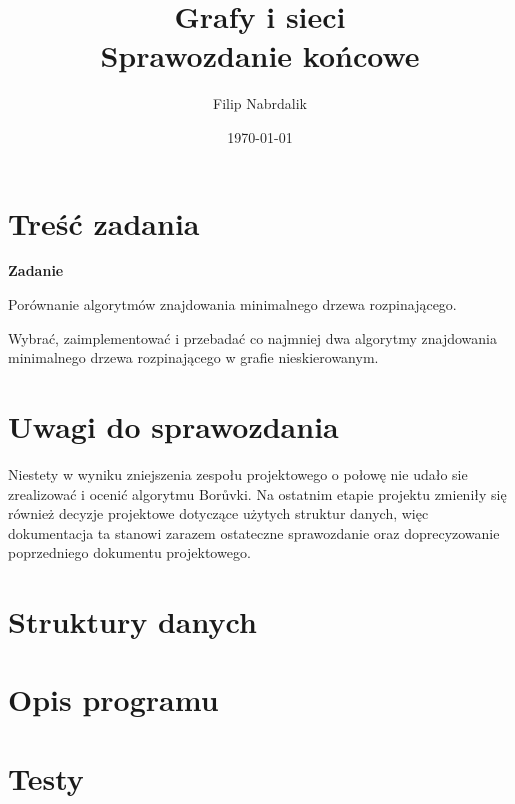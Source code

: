 \documentclass[a4paper, 10pt]{article}
\title{{\bf {Grafy i sieci}} \\ {\large Sprawozdanie końcowe}}
\date{\today}
\author{Filip Nabrdalik}
\begin{document}




\maketitle 




\newcommand{\ang}[1]{(ang. {\em #1}\/)}
\newcommand{\e}[1]{{\em #1}\/}





\section{Treść zadania}

{\bf{Zadanie}}

Porównanie algorytmów znajdowania minimalnego drzewa rozpinającego.

Wybrać, zaimplementować i przebadać co najmniej dwa algorytmy znajdowania minimalnego drzewa rozpinającego w grafie nieskierowanym. 

 

\section{Uwagi do sprawozdania}

Niestety w wyniku zniejszenia zespołu projektowego o połowę nie udało sie zrealizować i ocenić algorytmu Borůvki. 
Na ostatnim etapie projektu zmieniły się również decyzje projektowe dotyczące użytych struktur danych, więc 
dokumentacja ta stanowi zarazem ostateczne sprawozdanie oraz doprecyzowanie poprzedniego dokumentu projektowego.



\section{Struktury danych}


\section{Opis programu}

\section{Testy}
\end{document}
